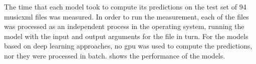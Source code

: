 
The time that each model took to compute its predictions on
the test set of 94 \gls{musicxml} files was measured. In
order to run the measurement, each of the files was
processed as an independent process in the operating system,
running the model with the input and output arguments for
the file in turn. For the models based on deep learning
approaches, no \gls{gpu} was used to compute the
predictions, nor they were processed in batch.
 shows the performance of the
models.


